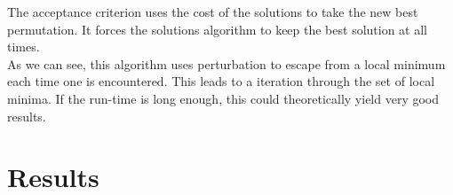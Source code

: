 The acceptance criterion uses the cost of the solutions to take the new best permutation. It forces the solutions algorithm to keep the best solution at all times.\\

As we can see, this algorithm uses perturbation to escape from a local minimum each time one is encountered. This leads to a iteration through the set of local minima. If the run-time is long enough, this could theoretically yield very good results.\\

\section{Results}

